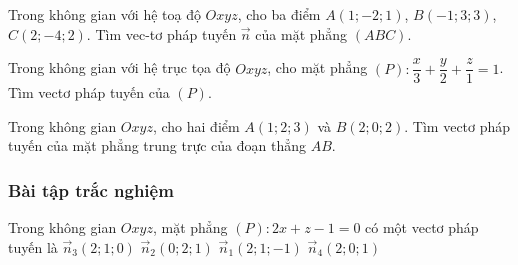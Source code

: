 \begin{vd}%
	
	Trong không gian với hệ toạ độ $Oxyz$, cho ba điểm $A\left( 1;-2;1 \right)$, $B\left( -1;3;3 \right)$, $C\left( 2;-4;2 \right)$. Tìm  vec-tơ pháp tuyến $\overrightarrow{n}$ của mặt phẳng $\left( ABC \right)$.
\end{vd}
\begin{vd}%
	Trong không gian với hệ trục tọa độ $Oxyz$, cho mặt phẳng $(P) \colon \dfrac{x}{3} + \dfrac{y}{2} + \dfrac{z}{1}=1$. Tìm vectơ pháp tuyến của $(P)$.
	
\end{vd}
\begin{vd}%
	Trong không gian $Oxyz$, cho hai điểm $A(1;2;3)$ và $B(2;0;2)$. Tìm  vectơ pháp tuyến  của mặt phẳng trung trực của đoạn thẳng $AB$.
	
\end{vd}

\subsubsection{Bài tập trắc nghiệm}
\begin{ex}%
	Trong không gian $Oxyz$, mặt phẳng $(P)\colon 2x + z - 1 = 0$ có một vectơ pháp tuyến là
	\choice
	{$ \overrightarrow{n}_{3} (2;1;0) $}
	{$ \overrightarrow{n}_{2} (0;2;1) $}
	{$ \overrightarrow{n}_{1} (2;1;-1) $}
	{\True $ \overrightarrow{n}_{4} (2;0;1) $}
\end{ex}

